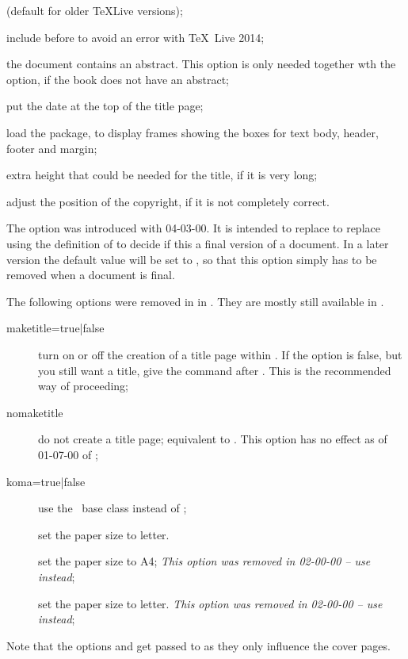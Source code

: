 \begin{description}
  (default for older \TeX Live versions);
\item[\Option{mhchem={\normalfont true}|false}] include  before  to avoid
  an error with \TeX\ Live 2014;
\item[\Option{abstract=true|\normalfont{false}}] the document contains an abstract.
  This option is only needed together wth the  option,
  if the book does not have an abstract;
\item[\Option{datetop=true|{\normalfont false}}] put the date at the top of the title page;
\item[\Option{showframe={\normalfont true}|false}] load the  package, to display frames showing the boxes for text body, header, footer and margin;
\item[\Option{titleextraheight=0em}] extra height that could be needed for the title, if it is very long;
\item[\Option{copyrightoffset=0em}] adjust the position of the copyright,
  if it is not completely correct.
\end{description}

The option  was introduced with  04-03-00.
It is intended to replace to replace using the definition of  to decide if this a final version of a document.
In a later version the default value will be set to ,
so that this option simply has to be removed when a document is final.

The following options were removed in  in .
They are mostly still available in .
\begin{description}
\item[maketitle={\normalfont true}|false] turn on or off the creation of a title page within .
  If the option is false, but you still want a title, give the command  after
  \verb||.
  This is the recommended way of proceeding;
\item[nomaketitle] do not create a title page; equivalent to .
  This option has no effect as of  01-07-00 of ;
\item[koma=true|{\normalfont false}] use the \KOMAScript\ base class  instead of ;
\item[] set the paper size to letter.
\item[] set the paper size to A4;
  \emph{This option was removed in  02-00-00
  -- use  instead};
\item[] set the paper size to letter.
  \emph{This option was removed in  02-00-00
  -- use  instead};
\end{description}
Note that the options  and  get passed to 
as they only influence the cover pages.

